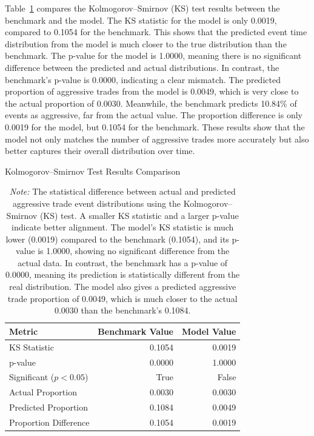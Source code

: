 Table~\ref{tb:ks-test-com} compares the Kolmogorov--Smirnov (KS) test results between the benchmark and the model. The KS statistic for the model is only 0.0019, compared to 0.1054 for the benchmark. This shows that the predicted event time distribution from the model is much closer to the true distribution than the benchmark. The p-value for the model is 1.0000, meaning there is no significant difference between the predicted and actual distributions. 
In contrast, the benchmark's p-value is 0.0000, indicating a clear mismatch.  The predicted proportion of aggressive trades from the model is 0.0049, which is very close to the actual proportion of 0.0030. Meanwhile, the benchmark predicts 10.84\% of events as aggressive, far from the actual value. The proportion difference is only 0.0019 for the model, but 0.1054 for the benchmark. These results show that the model not only matches the number of aggressive trades more accurately but also better captures their overall distribution over time.

\begin{table}[tbp]
    \centering
    \caption{Kolmogorov--Smirnov Test Results Comparison}
    \caption*{\textit{Note:} The statistical difference between actual and predicted aggressive trade event distributions using the Kolmogorov--Smirnov (KS) test. A smaller KS statistic and a larger p-value indicate better alignment. The model's KS statistic is much lower (0.0019) compared to the benchmark (0.1054), and its p-value is 1.0000, showing no significant difference from the actual data. In contrast, the benchmark has a p-value of 0.0000, meaning its prediction is statistically different from the real distribution. The model also gives a predicted aggressive trade proportion of 0.0049, which is much closer to the actual 0.0030 than the benchmark's 0.1084.}
    \label{tb:ks-test-com}
    \begin{tabular}{lrr}
    \toprule
    Metric & Benchmark Value & Model Value\\
    \midrule
    KS Statistic & 0.1054 & 0.0019 \\
    p-value & 0.0000 & 1.0000 \\
    Significant ($p < 0.05$) & True & False \\
    Actual Proportion & 0.0030 & 0.0030 \\
    Predicted Proportion & 0.1084 & 0.0049 \\
    Proportion Difference & 0.1054 & 0.0019 \\
    \bottomrule
    \end{tabular}
\end{table}
